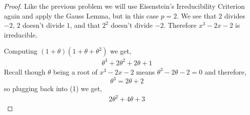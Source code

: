 \documentclass[11pt]{article}
\begin{document}
\begin{proof}
    Like the previous problem we will use Eisenstein's Irreducibility Criterion again and apply the Gauss Lemma, but in this case $p = 2$. We see that $2$ divides $-2$, $2$ doesn't divide $1$, and that $2^{2}$ doesn't divide $-2$. Therefore $x^{3} - 2x -2$ is irreducible. 

    Computing $(1 + \theta)(1 + \theta + \theta^{2})$ we get, 
    \begin{align}
        \theta^{3} + 2\theta^{2} + 2\theta + 1
    \end{align}
    Recall though $\theta$ being a root of $x^{3} - 2x -2$ means $\theta^{3} - 2\theta -2 = 0$ and therefore,
    \[\theta^{3} = 2\theta + 2\]
    so plugging back into (1) we get,
    \begin{align*}
         2\theta^{2} + 4\theta + 3 
    \end{align*}


\end{proof}
\end{document}

